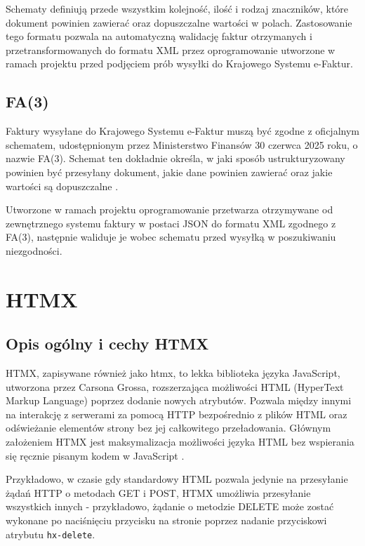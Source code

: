 Schematy definiują przede wszystkim kolejność, ilość i rodzaj znaczników, które dokument powinien zawierać oraz dopuszczalne wartości w polach. Zastosowanie tego formatu pozwala na automatyczną walidację faktur otrzymanych i przetransformowanych do formatu XML przez oprogramowanie utworzone w ramach projektu przed podjęciem prób wysyłki do Krajowego Systemu e-Faktur.

\subsection{FA(3)}
Faktury wysyłane do Krajowego Systemu e-Faktur muszą być zgodne z oficjalnym schematem, udostępnionym przez Ministerstwo Finansów 30 czerwca 2025 roku, o nazwie FA(3). Schemat ten dokładnie określa, w jaki sposób ustrukturyzowany powinien być przesyłany dokument, jakie dane powinien zawierać oraz jakie wartości są dopuszczalne \parencite{structured_invoice_2025}. 

Utworzone w ramach projektu oprogramowanie przetwarza otrzymywane od zewnętrznego systemu faktury w postaci JSON do formatu XML zgodnego z FA(3), następnie waliduje je wobec schematu przed wysyłką w poszukiwaniu niezgodności. 

\section{HTMX}
\subsection{Opis ogólny i cechy HTMX}
HTMX, zapisywane również jako htmx, to lekka biblioteka języka JavaScript, utworzona przez Carsona Grossa, rozszerzająca możliwości HTML (HyperText Markup Language) poprzez dodanie nowych atrybutów. Pozwala między innymi na interakcję z serwerami za pomocą HTTP bezpośrednio z plików HTML oraz odświeżanie elementów strony bez jej całkowitego przeładowania. Głównym założeniem HTMX jest maksymalizacja możliwości języka HTML bez wspierania się ręcznie pisanym kodem w JavaScript \parencite{htmx_docs}.

Przykładowo, w czasie gdy standardowy HTML pozwala jedynie na przesyłanie żądań HTTP o metodach GET i POST, HTMX umożliwia przesyłanie wszystkich innych - przykładowo, żądanie o metodzie DELETE może zostać wykonane po naciśnięciu przycisku na stronie poprzez nadanie przyciskowi atrybutu \texttt{hx-delete}.

